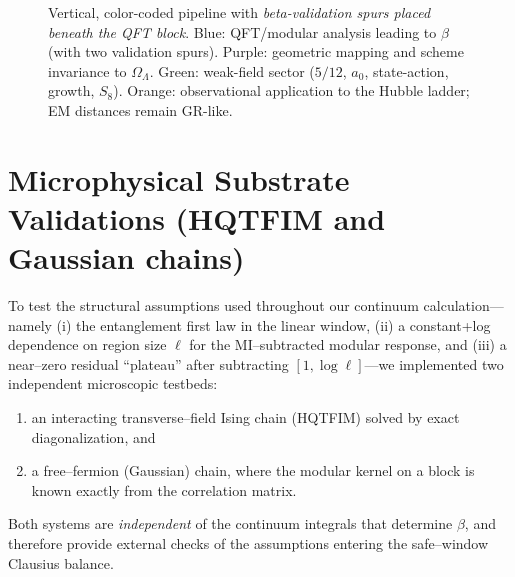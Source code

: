 \documentclass[aps,prd,onecolumn,superscriptaddress,nofootinbib]{revtex4-2}
\begin{document}
\begin{figure*}[t]
\begin{adjustbox}{max width=\textwidth, max height=0.9\textheight}
\end{adjustbox}
\caption{Vertical, color-coded pipeline with \emph{beta-validation spurs placed beneath the QFT block}. Blue: QFT/modular analysis leading to $\beta$ (with two validation spurs). Purple: geometric mapping and scheme invariance to $\Omega_\Lambda$. Green: weak-field sector ($5/12$, $a_0$, state-action, growth, $S_8$). Orange: observational application to the Hubble ladder; EM distances remain GR-like.}
\label{fig:pipeline}
\end{figure*}

\section{Microphysical Substrate Validations (HQTFIM and Gaussian chains)}
\label{sec:substrate-validations}
To test the structural assumptions used throughout our continuum calculation—namely (i) the entanglement first law in the linear window, (ii) a constant+log dependence on region size $\ell$ for the MI–subtracted modular response, and (iii) a near–zero residual ``plateau'' after subtracting $[1,\log\ell]$—we implemented two independent microscopic testbeds:
\begin{enumerate}[leftmargin=1.3em,label=(\alph*)]
\item an interacting transverse–field Ising chain (HQTFIM) solved by exact diagonalization, and
\item a free–fermion (Gaussian) chain, where the modular kernel on a block is known exactly from the correlation matrix.
\end{enumerate}
Both systems are \emph{independent} of the continuum integrals that determine $\beta$, and therefore provide external checks of the assumptions entering the safe–window Clausius balance.
\end{document}
